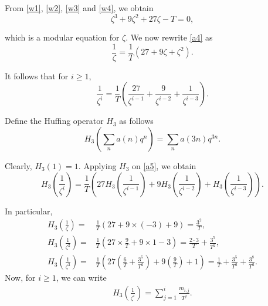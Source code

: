 \documentclass[11pt,a4paper]{article}
\numberwithin{equation}{section}
\theoremstyle{plain}
\begin{document}
\noindent	From \eqref{w1}, \eqref{w2}, \eqref{w3} and \eqref{w4}, we obtain
\begin{equation}\label{a4}
	\zeta^3 + 9\zeta^2 + 27\zeta - T = 0,
\end{equation}

\noindent	which is a modular equation for $\zeta$.  
We now rewrite \eqref{a4} as
\[
\frac{1}{\zeta} = \frac{1}{T}\left(27 + 9\zeta + \zeta^2\right). 
\]

\noindent	It follows that for $i \geq 1$,
\begin{equation}\label{a5}
	\frac{1}{\zeta^i} = \frac{1}{T}\left(\frac{27}{\zeta^{i-1}} + \frac{9}{\zeta^{i-2}} + \frac{1}{\zeta^{i-3}}\right).
\end{equation}

\noindent	Define the Huffing operator $H_3$ as follows
\[
H_3\!\left(\sum_n a(n) q^n\right) = \sum_n a(3n) q^{3n}.
\]


\noindent	Clearly, $H_3(1) = 1$.  
Applying $H_3$ on \eqref{a5}, we obtain
\[
H_3\!\left(\frac{1}{\zeta^i}\right) 
= \frac{1}{T}\left( 27H_3\!\left(\frac{1}{\zeta^{i-1}}\right)
+ 9H_3\!\left(\frac{1}{\zeta^{i-2}}\right)
+ H_3\!\left(\frac{1}{\zeta^{i-3}}\right)\right). 
\]

\noindent	In particular,
\begin{align*}
		H_3\!\left(\frac{1}{\zeta}\right) =& \frac{1}{T}\left(27 + 9 \times (-3) + 9\right) 
	= \frac{3^2}{T},\\
	H_3\!\left(\frac{1}{\zeta^2}\right) 
	=& \frac{1}{T}\left(27 \times \frac{9}{T} + 9 \times 1 - 3\right) 
	= \frac{2\cdot 3}{T} + \frac{3^5}{T^2}, \\
	H_3\!\left(\frac{1}{\zeta^3}\right) 
	=& \frac{1}{T}\left(27\!\left(\frac{6}{T} + \frac{3^5}{T^2}\right) + 9\!\left(\frac{9}{T}\right) + 1\right) 
	= \frac{1}{T} + \frac{3^5}{T^2} + \frac{3^8}{T^3}.
\end{align*}
\noindent Now, for $i \geq 1$, we can write
\begin{align}
	H_3\!\left(\frac{1}{\zeta^i}\right)
	= \sum_{j=1}^{i} \frac{m_{i,j}}{T^j}.\label{delta 3}
\end{align}
\end{document}
